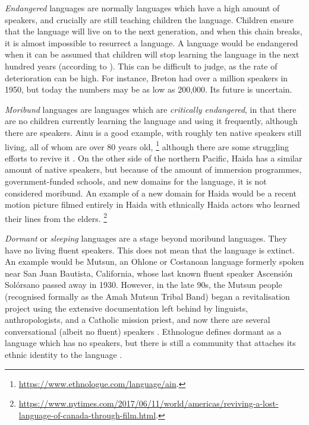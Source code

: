 {\it Endangered} languages are normally languages which have a high amount of speakers, and crucially are still teaching children the language. Children ensure that the language will live on to the next generation, and when this chain breaks, it is almost impossible to resurrect a language. A language would be endangered when it can be assumed that children will stop learning the language in the next hundred years (according to \citet{krauss92}). This can be difficult to judge, as the rate of deterioration can be high. For instance, Breton had over a million speakers in 1950, but today the numbers may be as low as 200,000. Its future is uncertain.

\emph{Moribund} languages are languages which are {\it critically endangered}, in that there are no children currently learning the language and using it frequently, although there are speakers. Ainu is a good example, with roughly ten native speakers still living, all of whom are over 80 years old, \footnote{\href{https://www.ethnologue.com/language/ain}{https://www.ethnologue.com/language/ain}. } although there are some struggling efforts to revive it \citep{hanks2017policy}. On the other side of the northern Pacific, Haida has a similar amount of native speakers, but because of the amount of immersion programmes, government-funded schools, and new domains for the language, it is not considered moribund. An example of a new domain for Haida would be a recent motion picture filmed entirely in Haida with ethnically Haida actors who learned their lines from the elders. \footnote{\href{https://www.nytimes.com/2017/06/11/world/americas/reviving-a-lost-language-of-canada-through-film.html}{https://www.nytimes.com/2017/06/11/world/americas/reviving-a-lost-language-of-canada-through-film.html}. }

\emph{Dormant} or \textit{sleeping} languages are a stage beyond moribund languages. They have no living fluent speakers. This does not mean that the language is extinct. An example would be Mutsun, an Ohlone or Costanoan language formerly spoken near San Juan Bautista, California, whose last known fluent speaker Ascensi\'on Sol\'orsano passed away in 1930. However, in the late 90s, the Mutsun people (recognised formally as the Amah Mutsun Tribal Band) began a revitalisation project using the extensive documentation left behind by linguists, anthropologists, and a Catholic mission priest, and now there are several conversational (albeit no fluent) speakers \citep{warner2007ethics}. Ethnologue defines dormant as a language which has no speakers, but there is still a community that attaches its ethnic identity to the language \citep{lewis2010assessing}.

